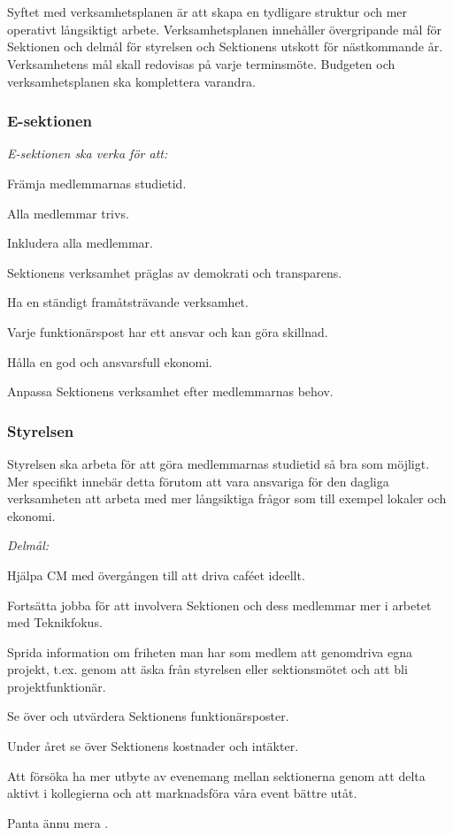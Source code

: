 \documentclass[10pt]{article}
\begin{document}
\section*{\doctitle}
Syftet med verksamhetsplanen är att skapa en tydligare struktur och mer operativt långsiktigt arbete. Verksamhetsplanen innehåller övergripande mål för Sektionen och delmål för styrelsen och Sektionens utskott för nästkommande år. Verksamhetens mål skall redovisas på varje terminsmöte. Budgeten och verksamhetsplanen ska komplettera varandra.

\subsubsection*{E-sektionen}
\emph{E-sektionen ska verka för att:}
\begin{dashlist}
    \item Främja medlemmarnas studietid.
    \item Alla medlemmar trivs.
    \item Inkludera alla medlemmar.
    \item Sektionens verksamhet präglas av demokrati och transparens.
    \item Ha en ständigt framåtsträvande verksamhet.
    \item Varje funktionärspost har ett ansvar och kan göra skillnad.
    \item Hålla en god och ansvarsfull ekonomi.
    \item Anpassa Sektionens verksamhet efter medlemmarnas behov.
\end{dashlist}

\subsubsection*{Styrelsen}
Styrelsen ska arbeta för att göra medlemmarnas studietid så bra som möjligt. Mer specifikt innebär detta förutom att vara ansvariga för den dagliga verksamheten att arbeta med mer långsiktiga frågor som till exempel lokaler och ekonomi.

\emph{Delmål:}
\begin{dashlist}
    \item Hjälpa CM med övergången till att driva caféet ideellt.
    \item Fortsätta jobba för att involvera Sektionen och dess medlemmar mer i arbetet med Teknikfokus.
    \item Sprida information om friheten man har som medlem att genomdriva egna projekt, t.ex. genom att äska från styrelsen eller sektionsmötet och att bli projektfunktionär.
    \item Se över och utvärdera Sektionens funktionärsposter.
    \item Under året se över Sektionens kostnader och intäkter.
    \item Att försöka ha mer utbyte av evenemang mellan sektionerna genom att delta aktivt i kollegierna och att marknadsföra våra event bättre utåt.
    \item Panta ännu mera \scalebox{0.4}{\recycle}.
\end{dashlist}
\end{document}
